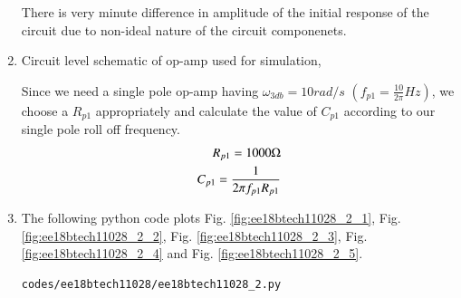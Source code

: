 \begin{enumerate}[label=\arabic*.,ref=\theenumi]
There is very minute difference in amplitude of the initial response of the circuit due to non-ideal nature of the circuit componenets.
\item
Circuit level schematic of op-amp used for simulation,
\begin{figure}[!ht]
	\begin{center}
		\resizebox{\columnwidth}{!}{}
	\end{center}
\caption{}
\label{fig:ee18btech11028_2_7}
\end{figure}

Since we need a single pole op-amp having $\omega_{3db}  =  10 rad/s$  $(f_{p1} = \frac{10}{2\pi} Hz)$,
we choose a $R_{p1}$ appropriately and calculate the value of $C_{p1}$ according to our single pole roll off frequency.
\begin{align}
    R_{p1}  = 1000 \ohm
    \\
    C_{p1} = \frac{1}{2  \pi f_{p1} R_{p1}}
\end{align}


\begin{table}[!ht]
    \centering
    
    \caption{}
    \label{table:ee18btech11028_2_opamp_circuit}
\end{table}


\item The following python code plots  Fig. \ref{fig:ee18btech11028_2_1}, Fig. \ref{fig:ee18btech11028_2_2}, Fig. \ref{fig:ee18btech11028_2_3}, Fig. \ref{fig:ee18btech11028_2_4} and Fig. \ref{fig:ee18btech11028_2_5}.
\begin{lstlisting}
codes/ee18btech11028/ee18btech11028_2.py
\end{lstlisting}

\end{enumerate}